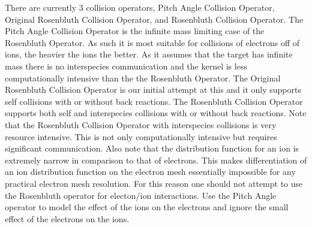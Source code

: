 \documentclass[11pt]{amsart}
\begin{document}
There are currently 3 collision operators, Pitch Angle Collision Operator,
Original Rosenbluth Collision Operator, and Rosenbluth Collision Operator.  The
Pitch Angle Collision Operator is the infinite mass limiting case of the
Rosenbluth Operator.  As such it is most suitable for collisions of electrons
off of ions, the heavier the ions the better.  As it assumes that the target
has infinite mass there is no interspecies communication and the kernel is less
computationally intensive than the the Rosenbluth Operator.  The Original
Rosenbluth Collision Operator is our initial attempt at this and it only
supports self collisions with or without back reactions.  The Rosenbluth
Collision Operator supports both self and interspecies collisions with or
without back reactions.  Note that the Rosenbluth Collision Operator with
interspecies collisions is very resource intensive.  This is not only
computationally intensive but requires significant communication.  Also note
that the distribution function for an ion is extremely narrow in comparison to
that of electrons.  This makes differentiation of an ion distribution function
on the electron mesh essentially impossible for any practical electron mesh
resolution.  For this reason one should not attempt to use the Rosenbluth
operator for electon/ion interactions.  Use the Pitch Angle operator to model
the effect of the ions on the electrons and ignore the small effect of the
electrons on the ions.
\end{document}
